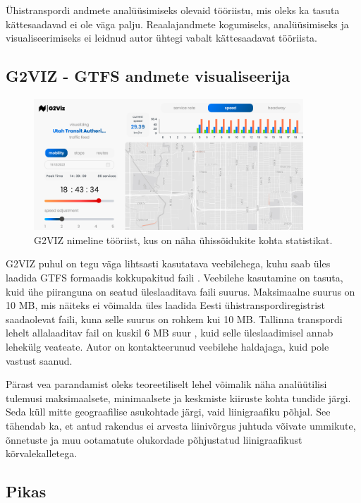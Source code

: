 Ühistranspordi andmete analüüsimiseks olevaid tööriistu, mis oleks ka tasuta kättesaadavad ei ole väga palju. Reaalajandmete kogumiseks, analüüsimiseks ja visualiseerimiseks ei leidnud autor ühtegi vabalt kättesaadavat tööriista.

\subsection{G2VIZ - GTFS andmete visualiseerija}

\begin{figure}[h!]
    \centering
    \includegraphics[width=0.9\textwidth]{figures/g2viz.png}
    \caption{G2VIZ nimeline tööriist, kus on näha ühissõidukite kohta statistikat.}
    \label{fig:sample}
\end{figure}

G2VIZ puhul on tegu väga lihtsasti kasutatava veebilehega, kuhu saab üles laadida GTFS formaadis kokkupakitud faili \cite{2024_pt_g2viz}. Veebilehe kasutamine on tasuta, kuid ühe piiranguna on seatud üleslaaditava faili suurus. Maksimaalne suurus on 10 MB, mis näiteks ei võimalda üles laadida Eesti ühistranspordiregistrist saadaolevat faili, kuna selle suurus on rohkem kui 10 MB. Tallinna transpordi lehelt allalaaditav fail on kuskil 6 MB suur \cite{transportTallinnEeGTFS}, kuid selle üleslaadimisel annab lehekülg veateate. Autor on kontakteerunud veebilehe haldajaga, kuid pole vastust saanud.

Pärast vea parandamist oleks teoreetiliselt lehel võimalik näha analüütilisi tulemusi maksimaalsete, minimaalsete ja keskmiste kiiruste kohta tundide järgi. Seda küll mitte geograafilise asukohtade järgi, vaid liinigraafiku põhjal. See tähendab ka, et antud rakendus ei arvesta liinivõrgus juhtuda võivate ummikute, õnnetuste ja muu ootamatute olukordade põhjustatud liinigraafikust kõrvalekalletega.

\subsection{Pikas}


